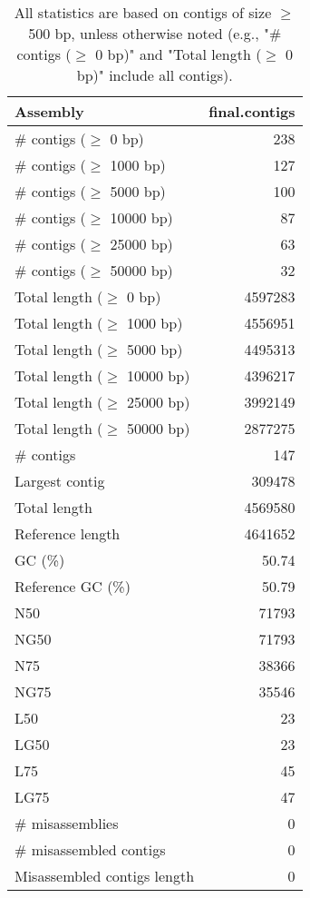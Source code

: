 \documentclass[12pt,a4paper]{article}
\begin{document}
\begin{table}[ht]
\begin{center}
\caption{All statistics are based on contigs of size $\geq$ 500 bp, unless otherwise noted (e.g., "\# contigs ($\geq$ 0 bp)" and "Total length ($\geq$ 0 bp)" include all contigs).}
\begin{tabular}{|l*{1}{|r}|}
\hline
Assembly & final.contigs \\ \hline
\# contigs ($\geq$ 0 bp) & 238 \\ \hline
\# contigs ($\geq$ 1000 bp) & 127 \\ \hline
\# contigs ($\geq$ 5000 bp) & 100 \\ \hline
\# contigs ($\geq$ 10000 bp) & 87 \\ \hline
\# contigs ($\geq$ 25000 bp) & 63 \\ \hline
\# contigs ($\geq$ 50000 bp) & 32 \\ \hline
Total length ($\geq$ 0 bp) & 4597283 \\ \hline
Total length ($\geq$ 1000 bp) & 4556951 \\ \hline
Total length ($\geq$ 5000 bp) & 4495313 \\ \hline
Total length ($\geq$ 10000 bp) & 4396217 \\ \hline
Total length ($\geq$ 25000 bp) & 3992149 \\ \hline
Total length ($\geq$ 50000 bp) & 2877275 \\ \hline
\# contigs & 147 \\ \hline
Largest contig & 309478 \\ \hline
Total length & 4569580 \\ \hline
Reference length & 4641652 \\ \hline
GC (\%) & 50.74 \\ \hline
Reference GC (\%) & 50.79 \\ \hline
N50 & 71793 \\ \hline
NG50 & 71793 \\ \hline
N75 & 38366 \\ \hline
NG75 & 35546 \\ \hline
L50 & 23 \\ \hline
LG50 & 23 \\ \hline
L75 & 45 \\ \hline
LG75 & 47 \\ \hline
\# misassemblies & 0 \\ \hline
\# misassembled contigs & 0 \\ \hline
Misassembled contigs length & 0 \\ \hline

\end{tabular}
\end{center}
\end{table}
\end{document}
